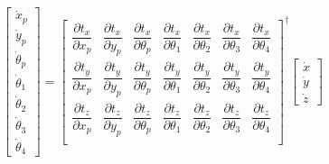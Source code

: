 \begin{equation*}
    \begin{bmatrix}
        \dot{x}_p \\
        \dot{y}_p \\
        \dot{\theta}_p \\
        \dot{\theta}_1 \\
        \dot{\theta}_2 \\
        \dot{\theta}_3 \\
        \dot{\theta}_4
    \end{bmatrix} =
    \begin{bmatrix}
        \dfrac{\partial t_x}{\partial x_p} & \dfrac{\partial t_x}{\partial y_p} & \dfrac{\partial t_x}{\partial \theta_p} & \dfrac{\partial t_x}{\partial \theta_1} & \dfrac{\partial t_x}{\partial \theta_2} & \dfrac{\partial t_x}{\partial \theta_3} & \dfrac{\partial t_x}{\partial \theta_4} \\
        \dfrac{\partial t_y}{\partial x_p} & \dfrac{\partial t_y}{\partial y_p} & \dfrac{\partial t_y}{\partial \theta_p} & \dfrac{\partial t_y}{\partial \theta_1} & \dfrac{\partial t_y}{\partial \theta_2} & \dfrac{\partial t_y}{\partial \theta_3} & \dfrac{\partial t_y}{\partial \theta_4} \\
        \dfrac{\partial t_z}{\partial x_p} & \dfrac{\partial t_z}{\partial y_p} & \dfrac{\partial t_z}{\partial \theta_p} & \dfrac{\partial t_z}{\partial \theta_1} & \dfrac{\partial t_z}{\partial \theta_2} & \dfrac{\partial t_z}{\partial \theta_3} & \dfrac{\partial t_z}{\partial \theta_4} \\
    \end{bmatrix}^\dagger
    \begin{bmatrix}
        \dot{x} \\
        \dot{y} \\
        \dot{z}
    \end{bmatrix}
\end{equation*}

